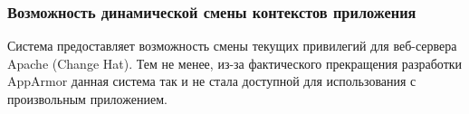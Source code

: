 \subsubsection{Возможность динамической смены 
контекстов приложения} 

Система предоставляет возможность смены
текущих привилегий для веб-сервера Apache
(Change Hat). Тем не менее, из-за фактического
прекращения разработки AppArmor данная 
система так и не стала доступной для использования
с произвольным приложением. 


\begin{comment}
AppArmor является системой безопасности, поддерживаемой 
компанией Novell, включена в дистрибутивы openSUSE и SUSE 
Enterprise.  Изначально в AppArmor включен набор 
стандартных профилей, запускаемых после установки. 
Отдельно доступны профили для разных популярных программ 
и серверов. Кроме этого, существуют инструменты для генерации 
профилей (genprof и logprof). Основная идея — верный выбор 
приложений, нуждающихся в ограничении привилегий и 
создание/редактирование профилей безопасности. Таким 
образом, в случае эксплуатации злоумышленником 
уязвимости,  нанесенный ущерб сводится 
к минимуму. 

Система может работать в двух режимах: режиме 
обучения (complain) и в принудительном режиме (enforce). 
В первом из них все нарушения правил профиля разрешены, 
но немедленно регистрируются. Загрузка профиля в 
принудительном режиме предписывает системе отправлять 
сообщения о нарушениях в syslogd. Запуск и остановку 
AppArmor можно осуществлять при помощи команды rcapparmor 
с одним из следующих параметров: start (загрузка модуля 
ядра, анализ профиля, монтирование своей фс); stop (фс 
размонтируется, профили становятся недействительными); 
reload (перезагрузка профилей), status (информация о 
количестве запущенных профилей, в каком режиме они 
работают). Инструменты командной строки AppArmor: autodep 
(создает приблизительный профиль для программы или 
рассматриваемого приложения); complain (устанавливает 
профиль AppArmor в обучающий режим); enforce (переводит 
профиль в принудительный режим); genprof (генерирует профиль,
программа указывается при запуске); logprof (управляет
профилями AppArmor); unconfined (выводит список процессов 
с портами tcp и udp, которые не имеют загруженных 
профилей AppArmor). Система AppArmor построена на системе 
полных путей к файлам, проще говоря, типичное описание 
профиля выглядит примерно так: 

\bigskip
\begin{lstlisting}
#include <tunables/global>  
/usr/bin/man { 
	#include <abstractions/base>
	#include <abstractions/nameservice>
	capability setgid,
	capability setuid,
	/usr/lib/man-db/man Px,} 
}
\end{lstlisting}


\end{comment}
